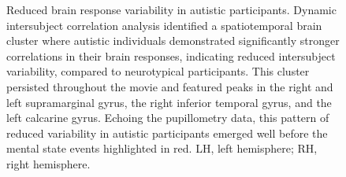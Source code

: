 \begin{figure}[!ht]
	\centering
	\caption{Reduced brain response variability in autistic participants. Dynamic intersubject correlation analysis identified a spatiotemporal brain cluster where autistic individuals demonstrated significantly stronger correlations in their brain responses, indicating reduced intersubject variability, compared to neurotypical participants. This cluster persisted throughout the movie and featured peaks in the right and left supramarginal gyrus, the right inferior temporal gyrus, and the left calcarine gyrus. Echoing the pupillometry data, this pattern of reduced variability in autistic participants emerged well before the mental state events highlighted in red. LH, left hemisphere; RH, right hemisphere.}
    \vspace*{-10pt}
	\label{fig:isc-fmri-time-asc}
\end{figure}



